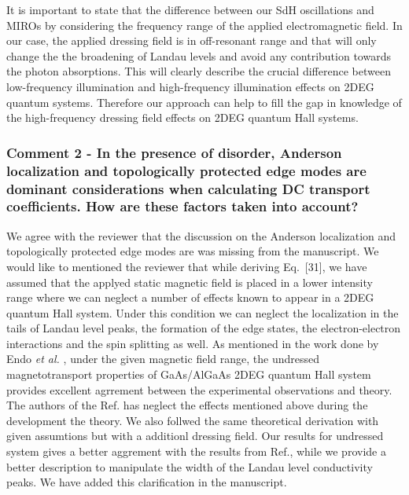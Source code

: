 \documentclass{article}
\begin{document}
\begin{itemize}
{  It is important to state that the difference between our SdH oscillations and MIROs \cite{zudov01,mani02,zudov03,mani04} by considering the frequency range of the applied electromagnetic field. In our case, the applied dressing field is in off-resonant range and that will only change the the broadening of Landau levels and avoid any contribution towards the photon absorptions. This will clearly describe the crucial difference between low-frequency illumination and high-frequency illumination effects on 2DEG quantum systems. Therefore our approach can help to fill the gap in knowledge of the high-frequency dressing field effects on 2DEG quantum Hall systems.
  }
\end{itemize}

\subsubsection*{Comment 2 -
\color{RoyalBlue} In the presence of disorder, Anderson localization and topologically protected edge modes are dominant considerations when calculating DC transport coefficients. How are these factors taken into account?
}

We agree with the reviewer that the discussion on the Anderson localization and topologically protected edge modes are was missing from the manuscript.
We would like to mentioned the reviewer that while deriving Eq.~[31], we have assumed that the applyed static magnetic field is placed in a lower intensity range where we can neglect a number of effects known to appear in a 2DEG quantum Hall system. Under this condition we can neglect the localization in the tails of Landau level peaks, the formation of the edge states, the electron-electron interactions and the spin splitting as well. As mentioned in the work done by Endo \textit{et al.} \cite{endo09}, under the given magnetic field range, the undressed magnetotransport properties of GaAs/AlGaAs 2DEG quantum Hall system provides excellent agrrement between the experimental observations and theory. The authors of the Ref.\cite{endo09} has neglect the effects mentioned above during the development the theory. We also follwed the same theoretical derivation with given assumtions but with a additionl dressing field. Our results for undressed system gives a better aggrement with the results from Ref.\cite{endo09}, while we provide a better description to manipulate the width of the Landau level conductivity peaks. We have added this clarification in the manuscript.
\end{document}
